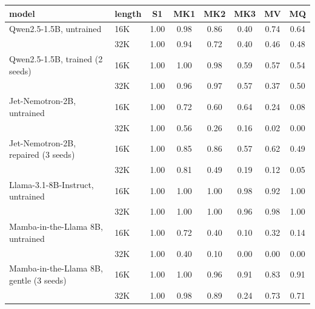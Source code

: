 \begin{tabular}{llcccccc}
\toprule
model & length & S1 & MK1 & MK2 & MK3 & MV & MQ \\
\midrule
Qwen2.5-1.5B, untrained & 16K & 1.00 & 0.98 & 0.86 & 0.40 & 0.74 & 0.64 \\
 & 32K & 1.00 & 0.94 & 0.72 & 0.40 & 0.46 & 0.48 \\
Qwen2.5-1.5B, trained (2 seeds) & 16K & 1.00 & 1.00 & 0.98 & 0.59 & 0.57 & 0.54 \\
 & 32K & 1.00 & 0.96 & 0.97 & 0.57 & 0.37 & 0.50 \\
Jet-Nemotron-2B, untrained & 16K & 1.00 & 0.72 & 0.60 & 0.64 & 0.24 & 0.08 \\
 & 32K & 1.00 & 0.56 & 0.26 & 0.16 & 0.02 & 0.00 \\
Jet-Nemotron-2B, repaired (3 seeds) & 16K & 1.00 & 0.85 & 0.86 & 0.57 & 0.62 & 0.49 \\
 & 32K & 1.00 & 0.81 & 0.49 & 0.19 & 0.12 & 0.05 \\
\addlinespace
Llama-3.1-8B-Instruct, untrained & 16K & 1.00 & 1.00 & 1.00 & 0.98 & 0.92 & 1.00 \\
 & 32K & 1.00 & 1.00 & 1.00 & 0.96 & 0.98 & 1.00 \\
Mamba-in-the-Llama 8B, untrained & 16K & 1.00 & 0.72 & 0.40 & 0.10 & 0.32 & 0.14 \\
 & 32K & 1.00 & 0.40 & 0.10 & 0.00 & 0.00 & 0.00 \\
Mamba-in-the-Llama 8B, gentle (3 seeds) & 16K & 1.00 & 1.00 & 0.96 & 0.91 & 0.83 & 0.91 \\
 & 32K & 1.00 & 0.98 & 0.89 & 0.24 & 0.73 & 0.71 \\
\bottomrule
\end{tabular}
